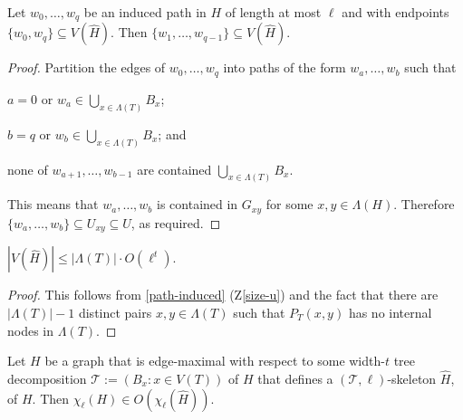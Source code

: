 \documentclass[kpfonts]{patmorin}
\newcommand{\lrn}{\chi_{\ell}}
\theoremstyle{named}
\begin{document}
\begin{lem}\label{skeleton-paths}
    Let $w_0,\ldots,w_q$ be an induced path in $H$ of length at most $\ell$ and with endpoints $\{w_0,w_q\}\subseteq V(\hat{H})$. Then $\{w_1,\ldots,w_{q-1}\}\subseteq V(\hat{H})$.
\end{lem}

\begin{proof}
    Partition the edges of $w_0,\ldots,w_q$ into paths of the form $w_a,\ldots,w_b$ such that
    \begin{inparaenum}[(i)]
        \item $a=0$ or $w_a\in\bigcup_{x\in \Lambda(T)} B_x$;
        \item $b=q$ or $w_b\in\bigcup_{x\in \Lambda(T)} B_x$; and
        \item none of $w_{a+1},\ldots,w_{b-1}$ are contained $\bigcup_{x\in \Lambda(T)} B_x$.
    \end{inparaenum}
    This means that $w_a,\ldots,w_b$ is contained in $G_{xy}$ for some $x,y\in \Lambda(H)$.  Therefore $\{w_a,\ldots,w_b\}\subseteq U_{xy}\subseteq U$, as required.
\end{proof}


\begin{lem}\label{skeleton-size}
    $|V(\hat{H})|\le |\Lambda(T)|\cdot O(\ell^t)$.
\end{lem}

\begin{proof}
    This follows from \cref{path-induced} (Z\ref{size-u}) and the fact that there are $|\Lambda(T)|-1$ distinct pairs $x,y\in\Lambda(T)$ such that $P_T(x,y)$ has no internal nodes in $\Lambda(T)$.
\end{proof}


\begin{lem}\label{skeleton-colour}
    Let $H$ be a graph that is edge-maximal with respect to some width-$t$ tree decomposition $\mathcal{T}:=(B_x:x\in V(T))$ of $H$ that defines a $(\mathcal{T},\ell)$-skeleton $\hat{H}$, of $H$.  Then $\lrn(H)\in O(\lrn(\hat{H}))$.
\end{lem}
\end{document}

